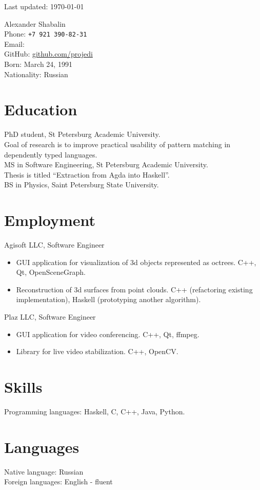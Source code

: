 \thispagestyle{empty}

\begin{flushright}
\scriptsize Last updated: \today
\end{flushright}

{\LARGE Alexander Shabalin}\\[1cm]
Phone: \texttt{+7 921 390-82-31}\\
Email: \\
GitHub: \url{github.com/projedi}\\[.1cm]
Born: March 24, 1991\\
Nationality: Russian

\section*{Education}

   PhD student, St Petersburg Academic University.\\
   Goal of research is to improve practical usability of pattern matching
   in dependently typed languages.\\[.3cm]
   MS in Software Engineering, St Petersburg Academic University.\\
   Thesis is titled ``Extraction from Agda into Haskell''.\\[.3cm]
   BS in Physics, Saint Petersburg State University.

\section*{Employment}

   Agisoft LLC, Software Engineer
   \begin{itemize}
      \itemsep 0cm
      \item GUI application for visualization of 3d objects represented as octrees.
            C++, Qt, OpenSceneGraph.
      \item Reconstruction of 3d surfaces from point clouds.
            C++ (refactoring existing implementation),
            Haskell (prototyping another algorithm).
   \end{itemize}
   Plaz LLC, Software Engineer
   \begin{itemize}
      \itemsep 0cm
      \item GUI application for video conferencing. C++, Qt, ffmpeg.
      \item Library for live video stabilization. C++, OpenCV.
   \end{itemize}

\section*{Skills}

Programming languages: Haskell, C, C++, Java, Python.

\section*{Languages}
Native language: Russian\\
Foreign languages: English - fluent
